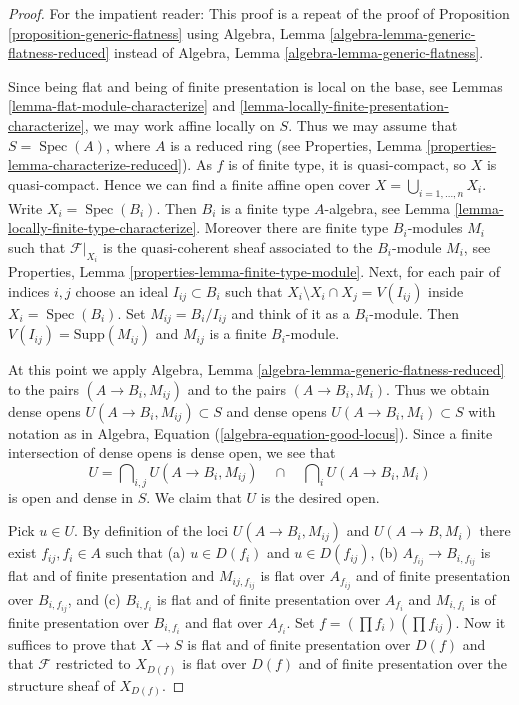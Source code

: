 \documentclass[10pt,a4paper]{amsart}
\theoremstyle{plain}
\theoremstyle{definition}
\theoremstyle{remark}
\numberwithin{equation}{subsection}
\def\Spec{\mathop{\mathrm{Spec}}}
\begin{document}
\begin{proof}
For the impatient reader: This proof is a repeat of the proof of
Proposition \ref{proposition-generic-flatness}
using
Algebra, Lemma \ref{algebra-lemma-generic-flatness-reduced}
instead of
Algebra, Lemma \ref{algebra-lemma-generic-flatness}.

\medskip\noindent
Since being flat and being of finite presentation is local on the
base, see
Lemmas \ref{lemma-flat-module-characterize} and
\ref{lemma-locally-finite-presentation-characterize},
we may work affine locally on $S$. Thus we may assume that
$S = \Spec(A)$, where $A$ is a reduced ring (see
Properties, Lemma \ref{properties-lemma-characterize-reduced}).
As $f$ is of finite type, it is quasi-compact, so $X$ is quasi-compact.
Hence we can find a finite affine open cover
$X = \bigcup_{i = 1, \ldots, n} X_i$. Write $X_i = \Spec(B_i)$.
Then $B_i$ is a finite type $A$-algebra, see
Lemma \ref{lemma-locally-finite-type-characterize}.
Moreover there are finite type
$B_i$-modules $M_i$ such that $\mathcal{F}|_{X_i}$ is the
quasi-coherent sheaf associated to the $B_i$-module $M_i$, see
Properties, Lemma \ref{properties-lemma-finite-type-module}.
Next, for each pair of indices $i, j$ choose an ideal $I_{ij} \subset B_i$
such that $X_i \setminus X_i \cap X_j = V(I_{ij})$ inside
$X_i = \Spec(B_i)$. Set $M_{ij} = B_i/I_{ij}$ and think
of it as a $B_i$-module. Then $V(I_{ij}) = \text{Supp}(M_{ij})$
and $M_{ij}$ is a finite $B_i$-module.

\medskip\noindent
At this point we apply
Algebra, Lemma \ref{algebra-lemma-generic-flatness-reduced} to
the pairs $(A \to B_i, M_{ij})$ and to the pairs $(A \to B_i, M_i)$.
Thus we obtain dense opens
$U(A \to B_i, M_{ij}) \subset S$ and dense opens
$U(A \to B_i, M_i) \subset S$ with notation as in
Algebra, Equation (\ref{algebra-equation-good-locus}).
Since a finite intersection of dense opens is dense open, we see that
$$
U =
\bigcap\nolimits_{i, j} U(A \to B_i, M_{ij})
\quad\cap\quad
\bigcap\nolimits_i U(A \to B_i, M_i)
$$
is open and dense in $S$. We claim that $U$ is the desired open.

\medskip\noindent
Pick $u \in U$. By definition of the loci $U(A \to B_i, M_{ij})$
and $U(A \to B, M_i)$ there exist $f_{ij}, f_i \in A$ such that
(a) $u \in D(f_i)$ and $u \in D(f_{ij})$,
(b) $A_{f_{ij}} \to B_{i, f_{ij}}$ is flat and of finite presentation
and $M_{ij, f_{ij}}$ is flat over $A_{f_{ij}}$ and of finite presentation
over $B_{i, f_{ij}}$, and
(c) $B_{i, f_i}$ is flat and of finite presentation over $A_{f_i}$ and
$M_{i, f_i}$ is of finite presentation over $B_{i, f_i}$ and flat over
$A_{f_i}$. Set
$f = (\prod f_i) (\prod f_{ij})$.
Now it suffices to prove that $X \to S$ is flat and of finite presentation
over $D(f)$ and that $\mathcal{F}$ restricted to $X_{D(f)}$ is
flat over $D(f)$ and of finite presentation over the structure sheaf
of $X_{D(f)}$.


\end{proof}
\end{document}
